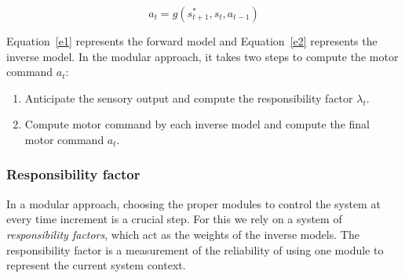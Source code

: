 \begin{equation}
\label{e9}
a_t = g\left({s^*_{t+1},s_t,a_{t-1}}\right)
\end{equation}


Equation~\ref{e1} represents the forward model and Equation~\ref{e2} represents the inverse model. In the modular approach, it takes two steps to compute the motor command $a_t$:
\begin{enumerate}
\item Anticipate the sensory output and compute the responsibility factor $\lambda_t$.
\item Compute motor command by each inverse model and compute the final motor command $a_t$.
\end{enumerate}


%

\subsubsection{Responsibility factor}
\label{sec:rf}

In a modular approach, choosing the proper modules to control the
system at every time increment is a crucial step. For this we rely on
a system of {\em responsibility factors}, which act as the weights of
the inverse models. The responsibility factor is a measurement of the
reliability of using one module to represent the current system
context.

%
%


